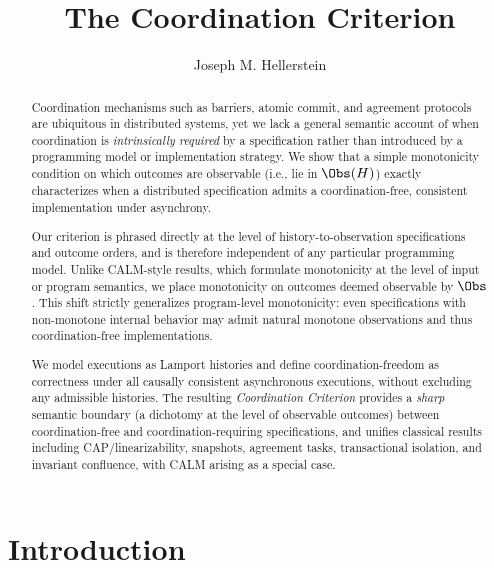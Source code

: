 \begin{abstract}
  Coordination mechanisms such as barriers, atomic commit, and agreement protocols
  are ubiquitous in distributed systems, yet we lack a general semantic account of
  when coordination is \emph{intrinsically required} by a specification rather than
  introduced by a programming model or implementation strategy.
  We show that a simple monotonicity condition on which outcomes are
  observable (i.e., lie in $\Obs(H)$)
  exactly characterizes when a distributed specification admits a coordination-free,
  consistent implementation under asynchrony.

  Our criterion is phrased directly at the level of history-to-observation
  specifications and outcome orders, and is therefore independent of any particular
  programming model.
  Unlike CALM-style results, which formulate monotonicity at the level of input or
  program semantics, we place monotonicity on outcomes deemed observable by $\Obs$.
  This shift strictly generalizes program-level monotonicity: even specifications
  with non-monotone internal behavior may admit natural monotone observations and
  thus coordination-free implementations.

  We model executions as Lamport histories and define coordination-freedom as
  correctness under all causally consistent asynchronous executions, without
  excluding any admissible histories.
  The resulting \emph{Coordination Criterion} provides a \emph{sharp} semantic boundary
  (a dichotomy at the level of observable outcomes)
  between coordination-free and coordination-requiring specifications, and
  unifies classical results including CAP/linearizability, snapshots, agreement
  tasks, transactional isolation, and invariant confluence, with CALM arising as a
  special case.
\end{abstract}


\title{The Coordination Criterion}
\author{Joseph M. Hellerstein}
\date{}
\maketitle



\section{Introduction}
\label{sec:introduction}


